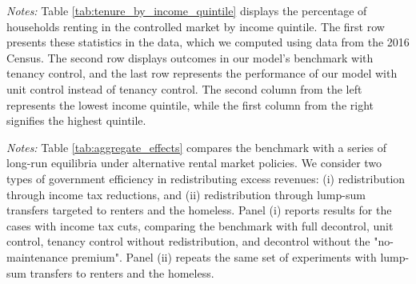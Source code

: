 \documentclass[parskip=full]{article}
\newenvironment{fignote2}[1]
{
\par
\medskip
\begin{minipage}{#1}
\footnotesize
}
{
\end{minipage}
}
\begin{document}
\begin{table}[H]
    \centering
    \caption{Households in controlled market by income quintile (all households)}
    \vspace{-0.5cm}
    \label{tab:tenure_by_income_quintile}     
    \vspace{-0.45cm}
    \begin{fignote2}{0.81\textwidth}
    \textit{Notes:} Table \ref{tab:tenure_by_income_quintile} displays the percentage of households renting in the controlled market by income quintile. The first row presents these statistics in the data, which we computed using data from the 2016 Census. The second row displays outcomes in our model's benchmark with tenancy control, and the last row represents the performance of our model with unit control instead of tenancy control. The second column from the left represents the lowest income quintile, while the first column from the right signifies the highest quintile.  
    \end{fignote2}
\end{table}

\begin{table}[H]
    \centering
    \caption{Aggregate effects generated by changes in rent-control policy}
    \vspace{-0.5cm}
    \label{tab:aggregate_effects}
    
    \vspace{-0.45cm}
    \begin{fignote2}{1.07\textwidth}
    \textit{Notes:} Table \ref{tab:aggregate_effects} compares the benchmark with a series of long-run equilibria under alternative rental market policies. We consider two types of government efficiency in redistributing excess revenues: (i) redistribution through income tax reductions, and (ii) redistribution through lump-sum transfers targeted to renters and the homeless. Panel (i) reports results for the cases with income tax cuts, comparing the benchmark with full decontrol, unit control, tenancy control without redistribution, and decontrol without the "no-maintenance premium". Panel (ii) repeats the same set of experiments with lump-sum transfers to renters and the homeless.
    \end{fignote2}
\end{table}
\end{document}
